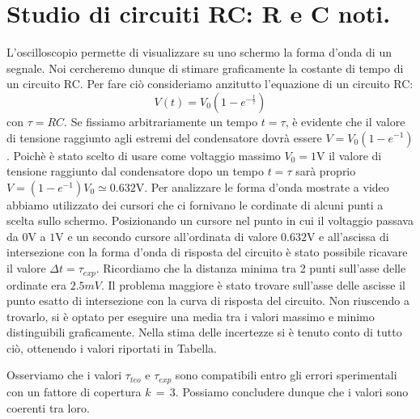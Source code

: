 \section{Studio di circuiti RC: R e C noti.}
L'oscilloscopio permette di visualizzare su uno schermo la forma d'onda di un segnale. Noi cercheremo dunque di stimare graficamente la costante di tempo di un circuito RC. Per fare ciò consideriamo anzitutto l'equazione di un circuito RC:
\begin{equation}
V(t)=V_0(1-e^{-\frac{t}{\tau}})
\label{RC}
\end{equation}
con $\tau=RC$. Se fissiamo arbitrariamente un tempo $t=\tau$, è evidente che il valore di tensione raggiunto agli estremi del condensatore dovrà essere $V=V_0(1-e^{-1})$. Poichè è stato scelto di usare come voltaggio massimo $V_0 = 1\si{\volt}$ il valore di tensione raggiunto dal condensatore dopo un tempo $t=\tau$ sarà proprio $V=(1-e^{-1})V_0 \simeq 0.632\si{\volt}$. 
Per analizzare le forma d'onda mostrate a video abbiamo utilizzato dei cursori che ci fornivano le cordinate di alcuni punti a scelta sullo schermo. Posizionando un cursore nel punto in cui il voltaggio passava da $0\si{\volt}$ a $1\si{\volt}$ e un secondo cursore all'ordinata di valore $0.632\si{\volt}$ e all'ascissa di intersezione con la forma d'onda di risposta del circuito è stato possibile ricavare il valore $\Delta t = \tau_{exp}$.
Ricordiamo che la distanza minima tra 2 punti sull'asse delle ordinate era $2.5mV$. Il problema maggiore è stato trovare sull'asse delle ascisse il punto esatto di intersezione con la curva di risposta del circuito. Non riuscendo a trovarlo, si è optato per eseguire una media tra i valori massimo e minimo distinguibili graficamente. Nella stima delle incertezze si è tenuto conto di tutto ciò, ottenendo i valori riportati in Tabella.


Osserviamo che i valori $\tau_{teo}$ e $\tau_{exp}$ sono compatibili entro gli errori sperimentali con un fattore di copertura $k\,=\,3$. Possiamo concludere dunque che i valori sono coerenti tra loro.